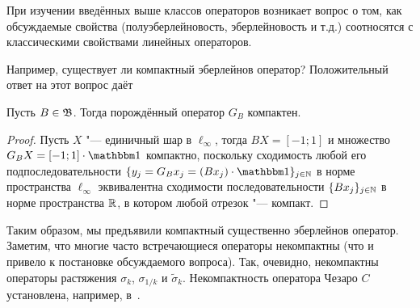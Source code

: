 При изучении введённых выше классов операторов возникает вопрос о том,
как обсуждаемые свойства (полуэберлейновость, эберлейновость и т.д.)
соотносятся с классическими свойствами линейных операторов.

Например, существует ли компактный эберлейнов оператор?
Положительный ответ на этот вопрос даёт

\begin{theorem}
	Пусть $B\in\mathfrak{B}$.
	Тогда порождённый оператор $G_B$ компактен.
\end{theorem}

\begin{proof}
	Пусть $X$ "--- единичный шар в $\ell_\infty$,
	тогда $BX = [-1;1]$
	и множество $G_B X = [-1;1] \cdot \one$
	компактно,
	поскольку сходимость любой его подпоследовательности $\{y_j = G_B x_j = (Bx_j) \cdot \one\}_{j\in\N}$
	в норме пространства $\ell_\infty$ эквивалентна сходимости последовательности
	$\{Bx_j\}_{j\in\mathbb{N}}$ в норме пространства $\mathbb{R}$,
	в котором любой отрезок "--- компакт.
\end{proof}

Таким образом, мы предъявили компактный существенно эберлейнов оператор.
Заметим, что многие часто встречающиеся операторы некомпактны
(что и привело к постановке обсуждаемого вопроса).
Так, очевидно, некомпактны операторы растяжения $\sigma_k$, $\sigma_{1/k}$ и $\tilde\sigma_k$.
Некомпактность оператора Чезаро $C$ установлена, например, в~\cite[теорема 4.4]{ALALAM20181038}.
